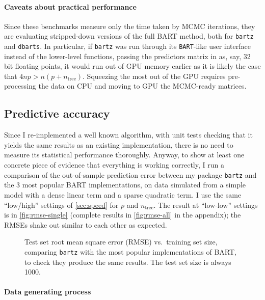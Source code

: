 \documentclass{article}
\newcommand{\halfcenter}[1]{\noindent\hspace{-\columnwidth}\makebox[3\columnwidth][c]{#1}}
\newcommand{\includempl}[1]{\texttt{[image: \#1]}}
\let\oldmarginpar\marginpar
\renewcommand{\marginpar}[1]{\oldmarginpar{\sffamily\scriptsize #1}}
\renewcommand{\marginpar}[1]{\relax} %
\begin{document}
    \paragraph{Caveats about practical performance}

    Since these benchmarks measure only the time taken by MCMC iterations, they are evaluating stripped-down versions of the full BART method, both for \texttt{bartz} and \texttt{dbarts}. In particular, if \texttt{bartz} was run through its \texttt{BART}-like user interface instead of the lower-level functions, passing the predictors matrix in as, say, 32 bit floating points, it would run out of GPU memory earlier as it is likely the case that $4np > n(p+n_\text{tree})$. Squeezing the most out of the GPU requires pre-processing the data on CPU and moving to GPU the MCMC-ready matrices.

    \subsection{Predictive accuracy}
    \label{sec:pred}

    Since I re-implemented a well known algorithm, with unit tests checking that it yields the same results as an existing implementation, there is no need to measure its statistical performance thoroughly. Anyway, to show at least one concrete piece of evidence that everything is working correctly, I run a comparison of the out-of-sample prediction error\marginpar{Measure also coverage.} between my package \texttt{bartz} and the 3 most popular BART implementations, on data simulated from a simple model with a dense linear term and a sparse quadratic term. I use the same ``low/high'' settings of \autoref{sec:speed} for $p$ and $n_\text{tree}$. The result at ``low-low'' settings is in \autoref{fig:rmse-single} (complete results in \autoref{fig:rmse-all} in the appendix); the RMSEs shake out similar to each other as expected.

    \begin{figure}
        \halfcenter{\includempl{rmse-single}}
        \caption{\label{fig:rmse-single} Test set root mean square error (RMSE) vs.\ training set size, comparing \texttt{bartz} with the most popular implementations of BART, to check they produce the same results. The test set size is always 1000.}
    \end{figure}

    \paragraph{Data generating process}
\end{document}
